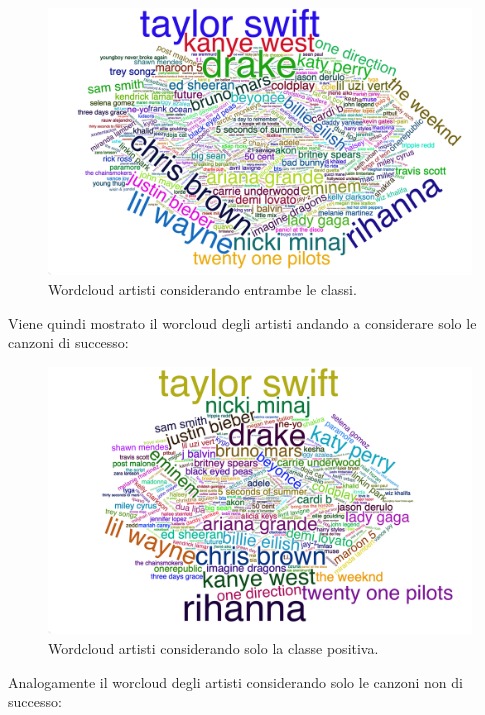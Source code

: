 \begin{figure}[H]
	\centering
	\includegraphics[width=14cm]{../images/wordcloud_overall_fix.png}
	\caption{Wordcloud artisti considerando entrambe le classi.}
\end{figure}

Viene quindi mostrato il worcloud degli artisti andando a considerare
solo le canzoni di successo:

\begin{figure}[H]
	\centering
	\includegraphics[width=14cm]{../images/wordcloud_positive_fix.png}
	\caption{Wordcloud artisti considerando solo la classe positiva.}
\end{figure}

Analogamente il worcloud degli artisti considerando solo le canzoni
non di successo:

